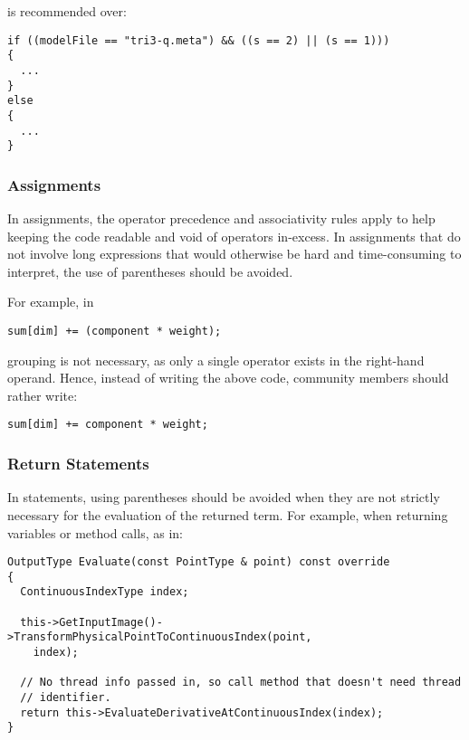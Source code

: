 is recommended over:

\small
\begin{verbatim}
if ((modelFile == "tri3-q.meta") && ((s == 2) || (s == 1)))
{
  ...
}
else
{
  ...
}
\end{verbatim}
\normalsize


\subsubsection{Assignments}
\label{subsubsec:Assignments}

In assignments, the operator precedence and associativity rules apply to help
keeping the code readable and void of operators in-excess. In assignments that
do not involve long expressions that would otherwise be hard and time-consuming
to interpret, the use of parentheses should be avoided.

For example, in

\small
\begin{verbatim}
sum[dim] += (component * weight);
\end{verbatim}
\normalsize

grouping is not necessary, as only a single operator exists in the right-hand
operand. Hence, instead of writing the above code, community members should
rather write:

\small
\begin{verbatim}
sum[dim] += component * weight;
\end{verbatim}
\normalsize


\subsubsection{Return Statements}
\label{subsubsec:ReturnStatements}

In  statements, using parentheses should be avoided when they
are not strictly necessary for the evaluation of the returned term. For example,
when returning variables or method calls, as in:

\small
\begin{verbatim}
OutputType Evaluate(const PointType & point) const override
{
  ContinuousIndexType index;

  this->GetInputImage()->TransformPhysicalPointToContinuousIndex(point,
    index);

  // No thread info passed in, so call method that doesn't need thread
  // identifier.
  return this->EvaluateDerivativeAtContinuousIndex(index);
}
\end{verbatim}
\normalsize

